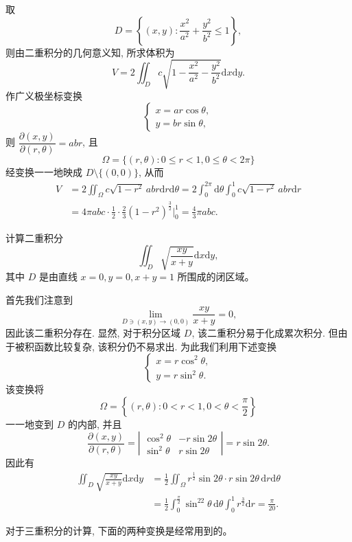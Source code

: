 \documentclass[12pt,fontset=fandol]{ctexart}
\begin{document}
\begin{solve}\quad 取
\[
  D=\left\{(x,y):\frac{x^2}{a^2}+\frac{y^2}{b^2}\leqslant1\right\},
\]
则由二重积分的几何意义知, 所求体积为
\[
  V=2\iint_D c\sqrt{1-\frac{x^2}{a^2}-\frac{y^2}{b^2}}\mathrm dx\mathrm dy.
\]
作广义极坐标变换
\[
  \begin{cases}
    x=ar\cos\theta,\\
    y=br\sin\theta,
  \end{cases}
\]
则 $\dfrac{\partial(x,y)}{\partial(r,\theta)}=abr$, 且
\[
  \Omega=\{(r,\theta):0\leqslant r<1,0\leqslant\theta<2\pi\}
\]
经变换一一地映成 $D\setminus\{(0,0)\}$, 从而
\[
\begin{aligned}
  V&=2\iint_\Omega c\sqrt{1-r^2}\,abr\mathrm dr\mathrm d\theta
  =2\int_0^{2\pi}\mathrm d\theta\int_0^1 c\sqrt{1-r^2}\,abr\mathrm dr\\
  &=4\pi abc\cdot\frac12\cdot\frac23(1-r^2)^{\frac32}\Big|_0^1
  =\frac43\pi abc.
\end{aligned}
\]

\end{solve}
\begin{example}\label{course-example-15-4-5}\quad 计算二重积分
\[
  \iint_D\sqrt{\frac{xy}{x+y}}\mathrm dx\mathrm dy,
\]
其中 $D$ 是由直线 $x=0,y=0,x+y=1$ 所围成的闭区域。

\end{example}
\begin{solve}\quad 首先我们注意到
\[
  \lim_{D\ni(x,y)\to(0,0)}\frac{xy}{x+y}=0,
\]
因此该二重积分存在. 显然, 对于积分区域 $D$, 该二重积分易于化成累次积分. 但由于被积函数比较复杂, 该积分仍不易求出. 为此我们利用下述变换
\[
  \begin{cases}
    x=r\cos^2\theta,\\
    y=r\sin^2\theta.
  \end{cases}
\]
该变换将
\[
  \Omega=\left\{(r,\theta):0<r<1,0<\theta<\frac\pi2\right\}
\]
一一地变到 $D$ 的内部, 并且
\[
  \frac{\partial(x,y)}{\partial(r,\theta)}
  =\left|\begin{matrix}
    \cos^2\theta&-r\sin2\theta\\
    \sin^2\theta&r\sin2\theta
  \end{matrix}\right|
  =r\sin2\theta.
\]
因此有
\[
\begin{aligned}
  \iint_D\sqrt{\frac{xy}{x+y}}\mathrm dx\mathrm dy
  &=\frac12\iint_\Omega r^{\frac12}\sin2\theta\cdot r\sin2\theta\,\mathrm dr\mathrm d\theta\\
  &=\frac12\int_0^{\frac\pi2}\sin^22\theta\,\mathrm d\theta\int_0^1 r^{\frac32}\mathrm dr
  =\frac\pi{20}.
\end{aligned}
\]

对于三重积分的计算, 下面的两种变换是经常用到的。

\end{solve}
\end{document}
